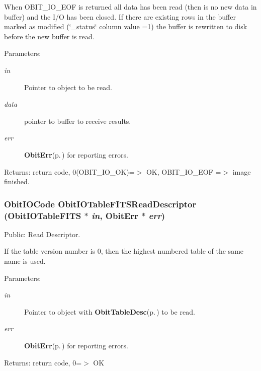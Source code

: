When OBIT\_\-IO\_\-EOF is returned all data has been read (then is no new data in buffer) and the I/O has been closed. If there are existing rows in the buffer marked as modified (\char`\"{}\_\-status\char`\"{} column value =1) the buffer is rewritten to disk before the new buffer is read. \begin{Desc}
\item[Parameters:]
\begin{description}
\item[{\em in}]Pointer to object to be read. \item[{\em data}]pointer to buffer to receive results. \item[{\em err}]{\bf Obit\-Err}{\rm (p.\,\pageref{structObitErr})} for reporting errors. \end{description}
\end{Desc}
\begin{Desc}
\item[Returns:]return code, 0(OBIT\_\-IO\_\-OK)=$>$ OK, OBIT\_\-IO\_\-EOF =$>$ image finished. \end{Desc}
\subsubsection{\setlength{\rightskip}{0pt plus 5cm}Obit\-IOCode Obit\-IOTable\-FITSRead\-Descriptor ({\bf Obit\-IOTable\-FITS} $\ast$ {\em in}, {\bf Obit\-Err} $\ast$ {\em err})}\label{ObitIOTableFITS_8h_a17}


Public: Read Descriptor. 

If the table version number is 0, then the highest numbered table of the same name is used. \begin{Desc}
\item[Parameters:]
\begin{description}
\item[{\em in}]Pointer to object with {\bf Obit\-Table\-Desc}{\rm (p.\,\pageref{structObitTableDesc})} to be read. \item[{\em err}]{\bf Obit\-Err}{\rm (p.\,\pageref{structObitErr})} for reporting errors. \end{description}
\end{Desc}
\begin{Desc}
\item[Returns:]return code, 0=$>$ OK \end{Desc}
